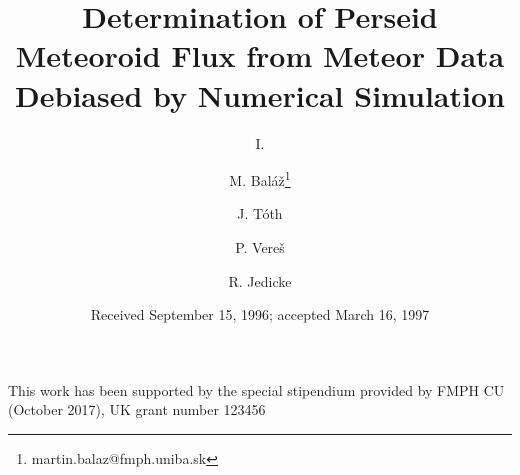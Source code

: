 \documentclass[referee]{aa}
\begin{document}
 
    \title{Determination of Perseid Meteoroid Flux from Meteor Data Debiased by Numerical Simulation}
    \subtitle{I. }

    \author{
        M. Baláž\fnmsep\thanks{martin.balaz@fmph.uniba.sk}
        \and
        J. Tóth
        \and
        P. Vereš
        \and
        R. Jedicke
    }


   \date{Received September 15, 1996; accepted March 16, 1997}





\maketitle
%








\begin{acknowledgements}
    This work has been supported by the special stipendium provided by FMPH CU (October 2017), UK grant number 123456
\end{acknowledgements}





\end{document}
